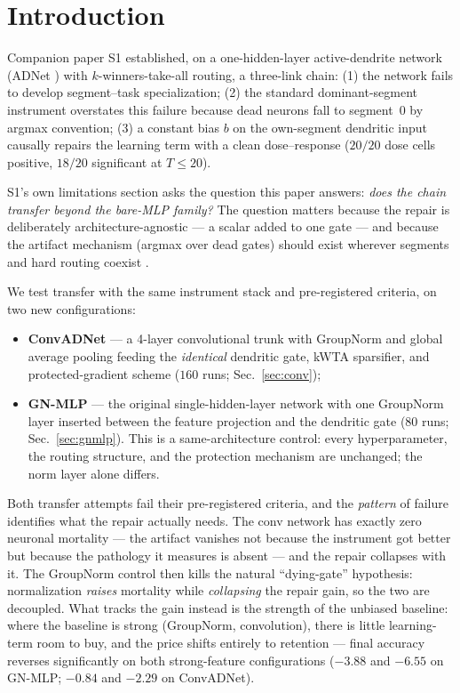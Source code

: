 \documentclass[review]{elsarticle}
\begin{document}
\section{Introduction}
\label{sec:intro}

Companion paper S1 \cite{zhou2026delpS1} established, on a
one-hidden-layer active-dendrite network (ADNet
\cite{iyer2022}) with $k$-winners-take-all routing, a three-link chain:
(1) the network fails to develop segment--task specialization;
(2) the standard dominant-segment instrument overstates this failure
because dead neurons fall to segment~0 by argmax convention;
(3) a constant bias $b$ on the own-segment dendritic input causally
repairs the learning term with a clean dose--response
($20/20$ dose cells positive, $18/20$ significant at $T \le 20$).

S1's own limitations section asks the question this paper answers:
\emph{does the chain transfer beyond the bare-MLP family?} The question
matters because the repair is deliberately architecture-agnostic ---
a scalar added to one gate --- and because the artifact mechanism
(argmax over dead gates) should exist wherever segments and hard
routing coexist \cite{boahen2022,poirazi2020}.

We test transfer with the same instrument stack and pre-registered
criteria, on two new configurations:

\begin{itemize}
\item \textbf{ConvADNet} --- a 4-layer convolutional trunk with
GroupNorm and global average pooling feeding the \emph{identical}
dendritic gate, kWTA sparsifier, and protected-gradient scheme
($160$ runs; Sec.~\ref{sec:conv});
\item \textbf{GN-MLP} --- the original single-hidden-layer network
with one GroupNorm layer inserted between the feature projection and
the dendritic gate ($80$ runs; Sec.~\ref{sec:gnmlp}). This is a
same-architecture control: every hyperparameter, the routing
structure, and the protection mechanism are unchanged; the norm layer
alone differs.
\end{itemize}

Both transfer attempts fail their pre-registered criteria, and the
\emph{pattern} of failure identifies what the repair actually needs.
The conv network has exactly zero neuronal mortality --- the artifact
vanishes not because the instrument got better but because the
pathology it measures is absent --- and the repair collapses with it.
The GroupNorm control then kills the natural ``dying-gate'' hypothesis:
normalization \emph{raises} mortality while \emph{collapsing} the
repair gain, so the two are decoupled. What tracks the gain instead is
the strength of the unbiased baseline: where the baseline is strong
(GroupNorm, convolution), there is little learning-term room to buy,
and the price shifts entirely to retention --- final accuracy
reverses significantly on both strong-feature configurations
($-3.88$ and $-6.55$ on GN-MLP; $-0.84$ and $-2.29$ on ConvADNet).
\end{document}
